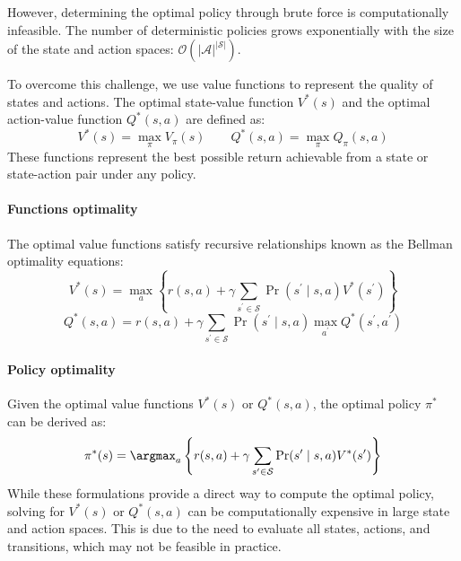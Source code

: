 However, determining the optimal policy through brute force is computationally infeasible. 
The number of deterministic policies grows exponentially with the size of the state and action spaces: $\mathcal{O}\left(\left\lvert \mathcal{A}\right\rvert^{\left\lvert \mathcal{S}\right\rvert}\right)$. 

To overcome this challenge, we use value functions to represent the quality of states and actions. 
The optimal state-value function $V^\ast(s)$ and the optimal action-value function $Q^\ast(s,a)$ are defined as:
\[V^\ast(s) = \max_{\pi} V_{\pi}(s) \qquad Q^\ast(s,a) = \max_{\pi} Q_{\pi}(s,a)\]
These functions represent the best possible return achievable from a state or state-action pair under any policy.

\paragraph*{Functions optimality}
The optimal value functions satisfy recursive relationships known as the Bellman optimality equations:
\[V^\ast(s) = \max_a \left\{ r(s,a) + \gamma \sum_{s^\prime \in \mathcal{S}} \Pr(s^\prime \mid s, a) V^\ast(s^\prime) \right\}\]
\[Q^\ast(s,a)=r(s,a)+\gamma\sum_{s^\prime\in\mathcal{S}}\Pr(s^\prime\mid s,a)\max_{a^\prime}Q^\ast(s^\prime,a^\prime)\]

\paragraph*{Policy optimality}
Given the optimal value functions $V^\ast(s)$ or $Q^\ast(s,a)$, the optimal policy $\pi^\ast$ can be derived as:
\[\pi^\ast(s)=\argmax_a\left\{r(s,a)+\gamma\sum_{s^\prime\in\mathcal{S}}\Pr(s^\prime\mid s,a)V^\ast(s^\prime)\right\}\]
While these formulations provide a direct way to compute the optimal policy, solving for $V^\ast(s)$ or $Q^\ast (s,a)$ can be computationally expensive in large state and action spaces. 
This is due to the need to evaluate all states, actions, and transitions, which may not be feasible in practice.